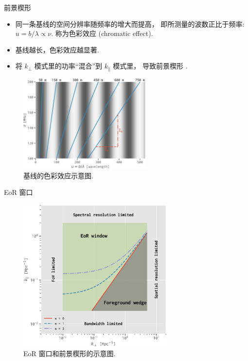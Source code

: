\documentclass{beamer}
\begin{document}
\begin{frame}{前景楔形}
  \begin{itemize}
    \item 同一条基线的空间分辨率随频率的增大而提高，
      即所测量的波数正比于频率: $u = b/\lambda \propto \nu$.
      称为\alert{色彩效应 (chromatic effect)}.
    \item 基线越长，色彩效应越显著.
    \item 将 $k_{\perp}$ 模式里的功率\enquote{混合}到 $k_{\parallel}$ 模式里，
      导致\alert{前景楔形} \cite{morales2012}.
  \end{itemize}

  \begin{figure}
    \centering
    \includegraphics[width=0.6\textwidth]{chromatic-baselines}
    \caption{基线的色彩效应示意图.}
  \end{figure}
\end{frame}

\begin{frame}{EoR 窗口}
  \begin{figure}
    \centering
    \includegraphics[width=0.7\textwidth]{EoR-window}
    \caption{EoR 窗口和前景楔形的示意图.}
  \end{figure}
\end{frame}
\end{document}
